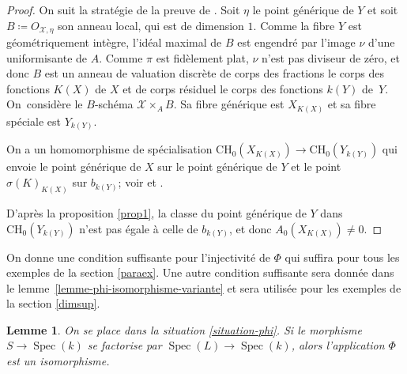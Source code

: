 \documentclass[11pt]{article}
\newcommand{\CH}{\mathrm{CH}}
\newtheorem{lemma}[thm]{Lemme}
\theoremstyle{definition}
\newcommand{\Spec}{\operatorname{Spec}}
\newcommand{\mc}[1]{\mathcal{#1}}
\begin{document}
\begin{proof}
On suit la stratégie de la preuve de \cite[Th.\,1.12]{colliot2016hypersurfaces}. Soit $\eta$ le point générique de $Y$ et soit $B\coloneqq O_{\mc{X},\eta}$ son anneau local, qui est de dimension $1$. Comme la fibre $Y$ est géométriquement intègre, l'idéal maximal de $B$ est engendré par l'image $\nu$ d'une uniformisante de $A$. Comme $\pi$ est fidèlement plat, $\nu$ n'est pas diviseur de zéro, et donc $B$ est un anneau de valuation discrète de corps des fractions le corps des fonctions $K(X)$ de $X$ et de corps résiduel le corps des fonctions $k(Y)$ de~$Y$. On~considère le $B$-schéma ${\mathcal X}\times_{A}B$. Sa fibre générique est $X_{K(X)}$ et sa fibre spéciale est $Y_{k(Y)}$.

On a un homomorphisme de spécialisation
$\CH_{0}(X_{K(X)}) \to \CH_{0}(Y_{k(Y)})$
qui envoie le point générique de $X$ sur le point générique de $Y$ et le point $\sigma(K)_{K(X)}$ sur $b_{k(Y)}$; voir \cite{fulton1975rational} et \cite[\S 20.3]{fulton1998intersection}.

D'après la proposition \ref{prop1}, la classe du point générique de $Y$
dans $\CH_{0}(Y_{k(Y)})$ n'est pas
égale à celle de $b_{k(Y)} $,
et donc $A_{0}(X_{K(X)}) \neq 0$.
\end{proof}

On donne une condition suffisante pour l'injectivité de $\Phi$ qui suffira pour tous les exemples de la section \ref{paraex}. Une autre condition suffisante sera donnée dans le lemme~\ref{lemme-phi-isomorphisme-variante} et sera utilisée pour les exemples de la section \ref{dimsup}.

\begin{lemma}\label{lemme-phi-isomorphisme}
On se place dans la situation \ref{situation-phi}. Si le morphisme $S \to \Spec(k)$ se factorise par $\Spec(L) \to \Spec(k)$, alors l'application $\Phi$ est un isomorphisme.
\end{lemma}
\end{document}
